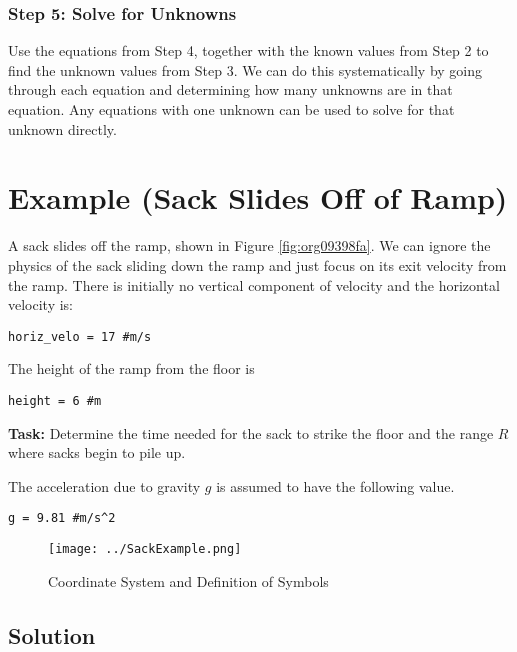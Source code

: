 \documentclass[11pt]{article}
\begin{document}
\subsubsection{Step 5: Solve for Unknowns}
\label{sec:org5bdde54}

Use the equations from Step 4, together with the known values from
Step 2 to find the unknown values from Step 3.  We can do this
systematically by going through each equation and determining how many
unknowns are in that equation.  Any equations with one unknown can be
used to solve for that unknown directly.

\section{Example (Sack Slides Off of Ramp)}
\label{sec:org59aeaa9}

A sack slides off the ramp, shown in Figure \ref{fig:org09398fa}.  We can
ignore the physics of the sack sliding down the ramp and just focus on
its exit velocity from the ramp.  There is initially no vertical
component of velocity and the horizontal velocity is:

\begin{verbatim}
horiz_velo = 17 #m/s
\end{verbatim}

The height of the ramp from the floor is

\begin{verbatim}
height = 6 #m
\end{verbatim}

\textbf{Task:} Determine the time needed for the sack to strike the floor and
the range \(R\) where sacks begin to pile up.

The acceleration due to gravity \(g\) is assumed to have the following
value.

\begin{verbatim}
g = 9.81 #m/s^2
\end{verbatim}

\begin{figure}[htbp]
\centering
\texttt{[image: ../SackExample.png]}
\caption{\label{fig:orgd71643e}Coordinate System and Definition of Symbols}
\end{figure}

\subsection{Solution}
\label{sec:orgb713291}
\end{document}
